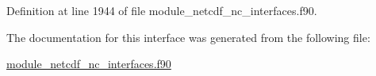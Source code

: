 Definition at line 1944 of file module\+\_\+netcdf\+\_\+nc\+\_\+interfaces.\+f90.



The documentation for this interface was generated from the following file\+:\begin{DoxyCompactItemize}
\item 
\hyperlink{module__netcdf__nc__interfaces_8f90}{module\+\_\+netcdf\+\_\+nc\+\_\+interfaces.\+f90}\end{DoxyCompactItemize}
